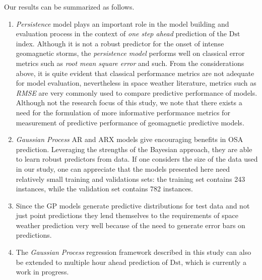 Our results can be summarized as follows.
\begin{enumerate}
      \item \emph{Persistence} model plays an important role in the model building and evaluation process in the context of \emph{one step ahead} prediction of the $ \mathrm{Dst}$ index. Although it is not a robust predictor for the onset of intense geomagnetic storms, the \emph{persistence model} performs well on classical error metrics such as \emph{root mean square error} and such. From the considerations above, it is quite evident that classical performance metrics are not adequate for model evaluation, nevertheless in space weather literature, metrics such as \emph{RMSE} are very commonly used to compare predictive performance of models. Although not the research focus of this study, we note that there exists a need for the formulation of more informative performance metrics for measurement of predictive performance of geomagnetic predictive models.
      
      \item \emph{Gaussian Process} AR and ARX models give encouraging benefits in OSA prediction. Leveraging the strengths of the Bayesian approach, they are able to learn robust predictors from data. If one considers the size of the data used in our study, one can appreciate that the models presented here need relatively small training and validations sets: the training set contains 243 instances, while the validation set contains 782 instances.
      
      \item Since the GP models generate predictive distributions for test data and not just point predictions they lend themselves to the requirements of space weather prediction very well because of the need to generate error bars on predictions.
      
      \item The \emph{Gaussian Process} regression framework described in this study can also be extended to multiple hour ahead prediction of $ \mathrm{Dst}$, which is currently a work in progress.
\end{enumerate}





%
%
%
%
%

